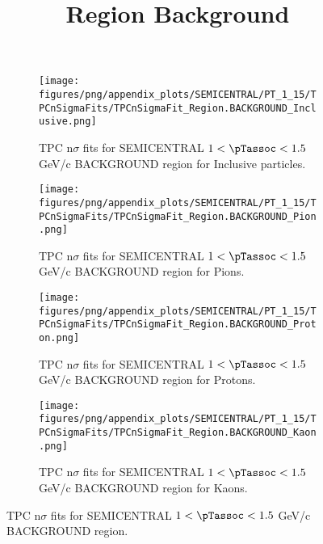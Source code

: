             \begin{figure}[H]
                \title{Region Background}
                \begin{subfigure}[b]{0.5\textwidth}
                    \centering
                    \texttt{[image: figures/png/appendix\_plots/SEMICENTRAL/PT\_1\_15/TPCnSigmaFits/TPCnSigmaFit\_Region.BACKGROUND\_Inclusive.png]}
                    \caption{TPC n$\sigma$ fits for SEMICENTRAL $1 < \pTassoc < 1.5$ GeV/c BACKGROUND region for Inclusive particles.}
                    \label{fig:appendix_SEMICENTRAL_$1 < \pTassoc < 1.5$ GeV/c_BACKGROUND_Inclusive}
                \end{subfigure}
                \begin{subfigure}[b]{0.5\textwidth}
                    \centering
                    \texttt{[image: figures/png/appendix\_plots/SEMICENTRAL/PT\_1\_15/TPCnSigmaFits/TPCnSigmaFit\_Region.BACKGROUND\_Pion.png]}
                    \caption{TPC n$\sigma$ fits for SEMICENTRAL $1 < \pTassoc < 1.5$ GeV/c BACKGROUND region for Pions.}
                    \label{fig:appendix_SEMICENTRAL_$1 < \pTassoc < 1.5$ GeV/c_BACKGROUND_Pion}
                \end{subfigure}
                \begin{subfigure}[b]{0.5\textwidth}
                    \centering
                    \texttt{[image: figures/png/appendix\_plots/SEMICENTRAL/PT\_1\_15/TPCnSigmaFits/TPCnSigmaFit\_Region.BACKGROUND\_Proton.png]}
                    \caption{TPC n$\sigma$ fits for SEMICENTRAL $1 < \pTassoc < 1.5$ GeV/c BACKGROUND region for Protons.}
                    \label{fig:appendix_SEMICENTRAL_$1 < \pTassoc < 1.5$ GeV/c_BACKGROUND_Proton}
                \end{subfigure}
                \begin{subfigure}[b]{0.5\textwidth}
                    \centering
                    \texttt{[image: figures/png/appendix\_plots/SEMICENTRAL/PT\_1\_15/TPCnSigmaFits/TPCnSigmaFit\_Region.BACKGROUND\_Kaon.png]}
                    \caption{TPC n$\sigma$ fits for SEMICENTRAL $1 < \pTassoc < 1.5$ GeV/c BACKGROUND region for Kaons.}
                    \label{fig:appendix_SEMICENTRAL_$1 < \pTassoc < 1.5$ GeV/c_BACKGROUND_Kaon}
                \end{subfigure}
                \caption{TPC n$\sigma$ fits for SEMICENTRAL $1 < \pTassoc < 1.5$ GeV/c BACKGROUND region.}
                \label{fig:appendix_SEMICENTRAL_$1 < \pTassoc < 1.5$ GeV/c_BACKGROUND}
            \end{figure}
            \clearpage
            

